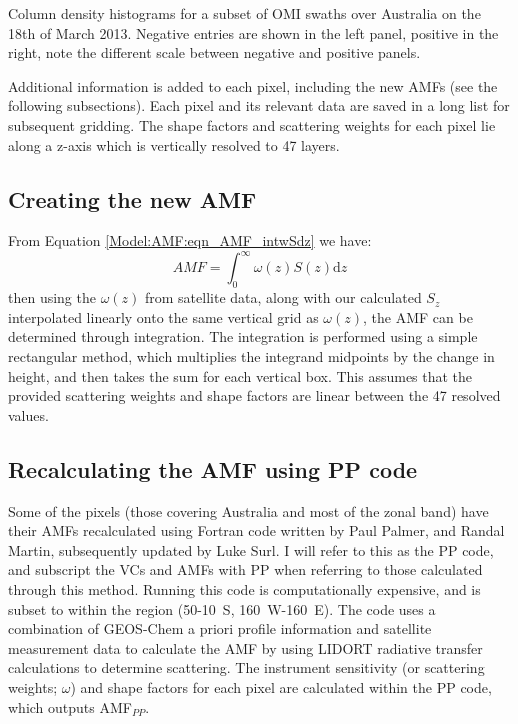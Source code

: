     {
      Column density histograms for a subset of OMI swaths over Australia on the 18th of March 2013.
      Negative entries are shown in the left panel, positive in the right, note the different scale between negative and positive panels.}
    {\label{Model:omiRecalc:fig_OMI_negative_hist}}
  
    Additional information is added to each pixel, including the new AMFs (see the following subsections).
    Each pixel and its relevant data are saved in a long list for subsequent gridding.
    The shape factors and scattering weights for each pixel lie along a z-axis which is vertically resolved to 47 layers.
  
  \subsection{Creating the new AMF}
    \label{Model:omiRecalc:AMFgc}
    
    From Equation \ref{Model:AMF:eqn_AMF_intwSdz} we have:
    $$ AMF = \int_0^\infty \omega(z) S(z) \mathrm{d}z $$
    then using the $\omega(z)$ from satellite data, along with our calculated $S_z$ interpolated linearly onto the same vertical grid as $\omega(z)$, the AMF can be determined through integration.
    The integration is performed using a simple rectangular method, which multiplies the integrand midpoints by the change in height, and then takes the sum for each vertical box.
    This assumes that the provided scattering weights and shape factors are linear between the 47 resolved values.
    
  \subsection{Recalculating the AMF using PP code}
    \label{Model:omiRecalc:ppcode}
    
    Some of the pixels (those covering Australia and most of the zonal band) have their AMFs recalculated using Fortran code written by Paul Palmer, and Randal Martin, subsequently updated by Luke Surl.
    I will refer to this as the PP code, and subscript the VCs and AMFs with PP when referring to those calculated through this method.
    Running this code is computationally expensive, and is subset to within the region (50-10\degr~S, 160\degr~W-160\degr~E).
    The code uses a combination of GEOS-Chem a priori profile information and satellite measurement data to calculate the AMF by using LIDORT radiative transfer calculations to determine scattering.
    The instrument sensitivity (or scattering weights; $\omega$) and shape factors for each pixel are calculated within the PP code, which outputs AMF$_{PP}$.
    
